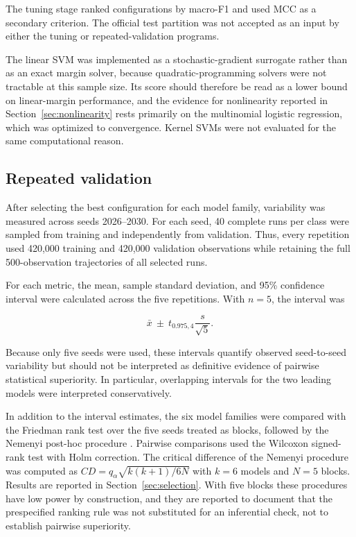 \documentclass[10pt,twocolumn,a4paper]{article}
\begin{document}
The tuning stage ranked configurations by macro-F1 and used MCC as a secondary
criterion. The official test partition was not accepted as an input by either
the tuning or repeated-validation programs.

The linear SVM was implemented as a stochastic-gradient surrogate rather than
as an exact margin solver, because quadratic-programming solvers were not
tractable at this sample size. Its score should therefore be read as a lower
bound on linear-margin performance, and the evidence for nonlinearity reported
in Section~\ref{sec:nonlinearity} rests primarily on the multinomial logistic
regression, which was optimized to convergence. Kernel SVMs were not evaluated
for the same computational reason.

\subsection{Repeated validation}

After selecting the best configuration for each model family, variability was
measured across seeds 2026--2030. For each seed, 40 complete runs per class were
sampled from training and independently from validation. Thus, every repetition
used 420,000 training and 420,000 validation observations while retaining the
full 500-observation trajectories of all selected runs.

For each metric, the mean, sample standard deviation, and 95\% confidence
interval were calculated across the five repetitions. With $n=5$, the interval
was

\begin{equation}
\bar{x}\ \pm\ t_{0.975,4}\frac{s}{\sqrt{5}}.
\end{equation}

Because only five seeds were used, these intervals quantify observed
seed-to-seed variability but should not be interpreted as definitive evidence
of pairwise statistical superiority. In particular, overlapping intervals for
the two leading models were interpreted conservatively.

In addition to the interval estimates, the six model families were compared
with the Friedman rank test over the five seeds treated as blocks, followed by
the Nemenyi post-hoc procedure \cite{demsar2006statistical}. Pairwise
comparisons used the Wilcoxon signed-rank test with Holm correction. The
critical difference of the Nemenyi procedure was computed as
$\mathit{CD}=q_{\alpha}\sqrt{k(k+1)/6N}$ with $k=6$ models and $N=5$ blocks.
Results are reported in Section~\ref{sec:selection}. With five blocks these
procedures have low power by construction, and they are reported to document
that the prespecified ranking rule was not substituted for an inferential
check, not to establish pairwise superiority.
\end{document}
